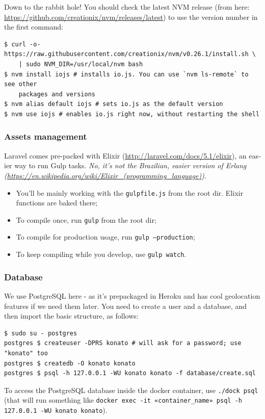 \documentclass[12pt,a4paper,twoside,hyphens,english,brazil]{abntex2}
\begin{document}
{\begin{otherlanguage}{english}
Down to the rabbit hole! You should check the latest NVM release (from here: \url{https://github.com/creationix/nvm/releases/latest}) to use the version number in the first command:

\begin{verbatim}
$ curl -o- https://raw.githubusercontent.com/creationix/nvm/v0.26.1/install.sh \
    | sudo NVM_DIR=/usr/local/nvm bash
$ nvm install iojs # installs io.js. You can use `nvm ls-remote` to see other
    packages and versions
$ nvm alias default iojs # sets io.js as the default version
$ nvm use iojs # enables io.js right now, without restarting the shell
\end{verbatim}

\subsubsection{Assets management}
Laravel comes pre-packed with Elixir (\url{http://laravel.com/docs/5.1/elixir}), an easier way to run Gulp tasks. \emph{No, it's not the Brazilian, easier version of Erlang (\url{https://en.wikipedia.org/wiki/Elixir_(programming_language)}).}

\begin{itemize}
	\item You'll be mainly working with the \texttt{gulpfile.js} from the root dir. Elixir functions are baked there;
	\item To compile once, run \texttt{gulp} from the root dir;
	\item To compile for production usage, run \texttt{gulp --production};
	\item To keep compiling while you develop, use \texttt{gulp watch}.
\end{itemize}

\subsubsection{Database}
We use PostgreSQL here - as it's prepackaged in Heroku and has cool geolocation features if we need them later. You need to create a user and a database, and then import the basic structure, as follows:

\begin{verbatim}
$ sudo su - postgres
postgres $ createuser -DPRS konato # will ask for a password; use "konato" too
postgres $ createdb -O konato konato
postgres $ psql -h 127.0.0.1 -WU konato konato -f database/create.sql
\end{verbatim}
To access the PostgreSQL database inside the docker container, use \texttt{./dock psql} (that will run something like \texttt{docker exec -it «container\_name» psql -h 127.0.0.1 -WU konato konato}).


\end{otherlanguage}}
\end{document}
